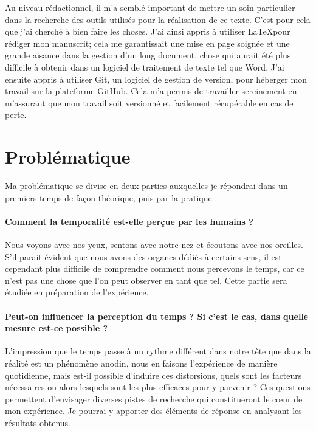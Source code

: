 \documentclass[12pt,fleqn,oneside,openany]{book} %
\begin{document}
Au niveau rédactionnel, il m'a semblé important de mettre un soin particulier dans la recherche des outils utilisés pour la réalisation de ce texte. C'est pour cela que j'ai cherché à bien faire les choses. J'ai ainsi appris à utiliser \LaTeX pour rédiger mon manuscrit; cela me garantissait une mise en page soignée et une grande aisance dans la gestion d'un long document, chose qui aurait été plus difficile à obtenir dans un logiciel de traitement de texte tel que Word. J'ai ensuite appris à utiliser Git, un logiciel de gestion de version, pour héberger mon travail sur la plateforme GitHub. Cela m'a permis de travailler sereinement en m'assurant que mon travail soit versionné et facilement récupérable en cas de perte.

\section{Problématique} \label{sec:problematique}
Ma problématique se divise en deux parties auxquelles je répondrai dans un premiers temps de façon théorique, puis par la pratique :

\paragraph{Comment la temporalité est-elle perçue par les humains ?} Nous voyons avec nos yeux, sentons avec notre nez et écoutons avec nos oreilles. S'il parait évident que nous avons des organes dédiés à certains sens, il est cependant plus difficile de comprendre comment nous percevons le temps, car ce n'est pas une chose que l'on peut observer en tant que tel. Cette partie sera étudiée en préparation de l'expérience. 

\paragraph{Peut-on influencer la perception du temps ? Si c'est le cas, dans quelle mesure est-ce possible ?} L'impression que le temps passe à un rythme différent dans notre tête que dans la réalité est un phénomène anodin, nous en faisons l'expérience de manière quotidienne, mais est-il possible d'induire ces distorsions, quels sont les facteurs nécessaires ou alors lesquels sont les plus efficaces pour y parvenir ? Ces questions permettent d'envisager diverses pistes de recherche qui constitueront le cœur de mon expérience. Je pourrai y apporter des éléments de réponse en analysant les résultats obtenus. %
\end{document}

